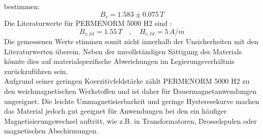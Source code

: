     bestimmen: 
    \begin{equation*}
        B_s = 1.583 \pm 0.075 \, T
    \end{equation*}
    Die Literaturwerte für PERMENORM 5000 H2 sind \cite{Permenorm}:
    \begin{equation*}
         B_{s,lit} = 1.55 \, T \quad , \quad H_{c,lit} = 5 \, A/m
    \end{equation*}
    Die gemessenen Werte stimmen somit nicht innerhalb der Unsicherheiten mit den Literaturwerten überein.
    Neben der unvollständigen Sättigung des Materials könnte dies auf materialspezifische Abweichungen im Legierungsverhältnis
    zurückzuführen sein. \\
    Aufgrund seiner geringen Koerzitivfeldstärke zählt PERMENORM 5000 H2 zu den weichmagnetischen Werkstoffen und ist daher für Dauermagnetanwendungen ungeeignet.
    Die leichte Ummagnetisierbarkeit und geringe Hysteresekurve machen das Material jedoch gut geeignet für Anwendungen bei den ein häufiger
    Magnetisierungswechsel auftritt, wie z.B. in Transformatoren, Drosselspulen oder magnetischen Abschirmungen.

